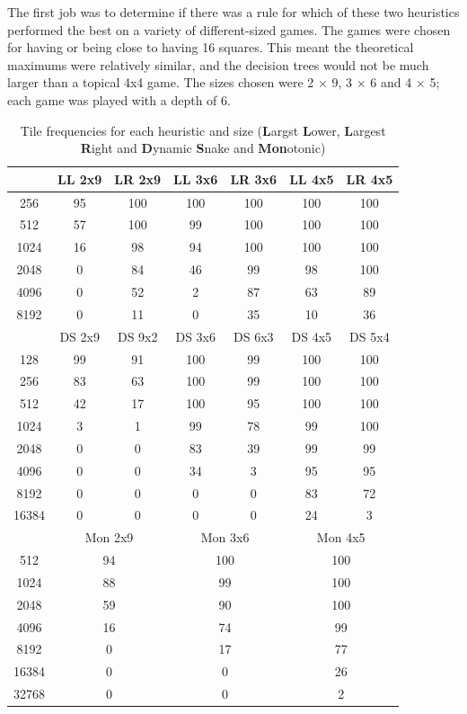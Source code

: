 \documentclass{article}
\begin{document}
The first job was to determine if there was a rule for which of these two heuristics performed the best on a variety of different-sized games. The games were chosen for having or being close to having 16 squares. This meant the theoretical maximums were relatively similar, and the decision trees would not be much larger than a topical 4x4 game. The sizes chosen were 2 × 9, 3 × 6 and 4 × 5; each game was played with a depth of 6.
\begin{table}
    \centering
\begin{tabular}{|c|cccccc|}
\hline
&LL 2x9&LR 2x9&LL 3x6&LR 3x6&LL 4x5&LR 4x5\\
\hline
256&95&100&100&100&100&100\\
512&57&100&99&100&100&100\\
1024&16&98&94&100&100&100\\
2048&0&84&46&99&98&100\\
4096&0&52&2&87&63&89\\
8192&0&11&0&35&10&36\\
\hline
&DS 2x9&DS 9x2&DS 3x6&DS 6x3&DS 4x5&DS 5x4\\
\hline
128&99&91&100&99&100&100\\
256&83&63&100&99&100&100\\
512&42&17&100&95&100&100\\
1024&3&1&99&78&99&100\\
2048&0&0&83&39&99&99\\
4096&0&0&34&3&95&95\\
8192&0&0&0&0&83&72\\
16384&0&0&0&0&24&3\\
\hline
&\multicolumn{2}{c}{Mon 2x9}&\multicolumn{2}{c}{Mon 3x6}&\multicolumn{2}{c|}{Mon 4x5}\\
\hline
512&\multicolumn{2}{c}{94}&\multicolumn{2}{c}{100}&\multicolumn{2}{c|}{100}\\
1024&\multicolumn{2}{c}{88}&\multicolumn{2}{c}{99}&\multicolumn{2}{c|}{100}\\
2048&\multicolumn{2}{c}{59}&\multicolumn{2}{c}{90}&\multicolumn{2}{c|}{100}\\
4096&\multicolumn{2}{c}{16}&\multicolumn{2}{c}{74}&\multicolumn{2}{c|}{99}\\
8192&\multicolumn{2}{c}{0}&\multicolumn{2}{c}{17}&\multicolumn{2}{c|}{77}\\
16384&\multicolumn{2}{c}{0}&\multicolumn{2}{c}{0}&\multicolumn{2}{c|}{26}\\
32768&\multicolumn{2}{c}{0}&\multicolumn{2}{c}{0}&\multicolumn{2}{c|}{2}\\
\hline
\end{tabular}
    \caption{Tile frequencies for each heuristic and size (\textbf{L}argst \textbf{L}ower,  \textbf{L}argest \textbf{R}ight and \textbf{D}ynamic \textbf{S}nake and \textbf{Mon}otonic)}
    \label{tab:LLLR}
\end{table}
\end{document}
